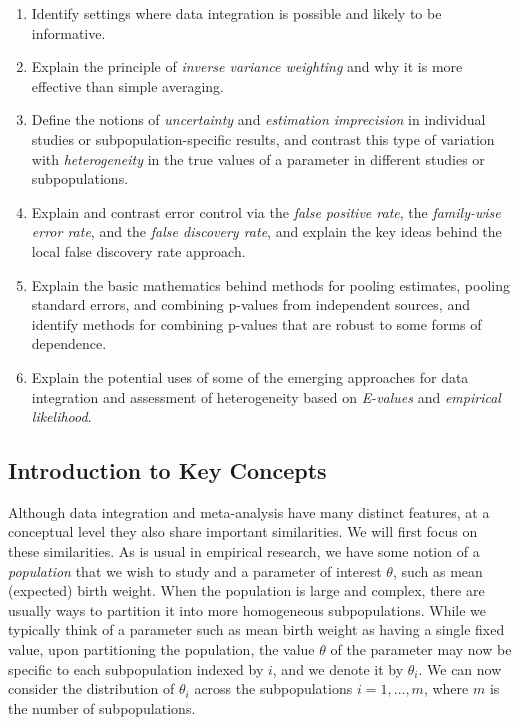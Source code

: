 \begin{enumerate}
    \item Identify settings where data integration is possible and likely to be informative.
    \item Explain the principle of {\em inverse variance weighting} and why it is more effective than simple averaging.
    \item Define the notions of {\em uncertainty} and {\em estimation imprecision} in individual studies or subpopulation-specific results, and contrast this type of variation with {\em heterogeneity} in the true values of a parameter in different studies or subpopulations.
    \item Explain and contrast error control via the {\em false positive rate}, the {\em family-wise error rate}, and the {\em false discovery rate}, and explain the key ideas behind the local false discovery rate approach.
    \item Explain the basic mathematics behind methods for pooling estimates, pooling standard errors, and combining p-values from independent sources, and identify methods for combining p-values that are robust to some forms of dependence.
    \item Explain the potential uses of some of the emerging approaches for data integration and assessment of heterogeneity based on {\em E-values} and {\em empirical likelihood}.
\end{enumerate}

\subsection{Introduction to Key Concepts}

Although data integration and meta-analysis have many distinct features, at a conceptual level they also share important similarities. We will first focus on these similarities. As is usual in empirical research, we have some notion of a {\em population} that we wish to study and a parameter of interest $\theta$, such as mean (expected) birth weight. When the population is large and complex, there are usually ways to partition it into more homogeneous subpopulations. While we typically think of a parameter such as mean birth weight as having a single fixed value, upon partitioning the population, the value $\theta$ of the parameter may now be specific to each subpopulation indexed by $i$, and we denote it by $\theta_i$. We can now consider the distribution of $\theta_i$ across the subpopulations $i=1, \ldots, m$, where $m$ is the number of subpopulations.

